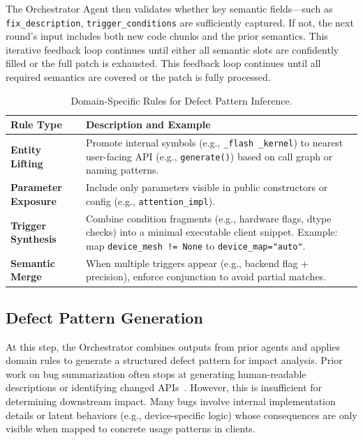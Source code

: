 The Orchestrator Agent then validates whether key semantic fields—such as \texttt{fix\_description}, \texttt{trigger\_conditions} are sufficiently captured. 
If not, the next round’s input includes both new code chunks and the prior semantics. 
This iterative feedback loop continues until either all semantic slots are confidently filled or the full patch is exhausted.
This feedback loop continues until all required semantics are covered or the patch is fully processed.



\begin{table}
\centering
\caption{Domain-Specific Rules for Defect Pattern Inference.}
\label{tab:orchestrator-rules}
\begin{tabular}{p{1.5cm}|p{6cm}}
\toprule
\textbf{Rule Type} & \textbf{Description and Example} \\
\midrule
\textbf{Entity Lifting} & Promote internal symbols (e.g., \texttt{\_flash \_kernel}) to nearest user-facing API (e.g., \texttt{generate()}) based on call graph or naming patterns. \\
\hline
\textbf{Parameter Exposure} & Include only parameters visible in public constructors or config (e.g., \texttt{attention\_impl}). \\
\hline
\textbf{Trigger Synthesis} & Combine condition fragments (e.g., hardware flags, dtype checks) into a minimal executable client snippet. Example: map \texttt{device\_mesh != None} to \texttt{device\_map="auto"}. \\
\hline
\textbf{Semantic Merge} & When multiple triggers appear (e.g., backend flag + precision), enforce conjunction to avoid partial matches. \\
\bottomrule
\end{tabular}
\vspace{-0.5cm}
\end{table}

\subsection{Defect Pattern Generation}
At this step, the Orchestrator combines outputs from prior agents and applies domain rules to generate a structured defect pattern for impact analysis.
Prior work on bug summarization often stops at generating human-readable descriptions or identifying changed APIs~\cite{liu2019automatic,xiao2024generative}.
However, this is insufficient for determining downstream impact.
Many bugs involve internal implementation details or latent behaviors (e.g., device-specific logic) whose consequences are only visible when mapped to concrete usage patterns in clients.

